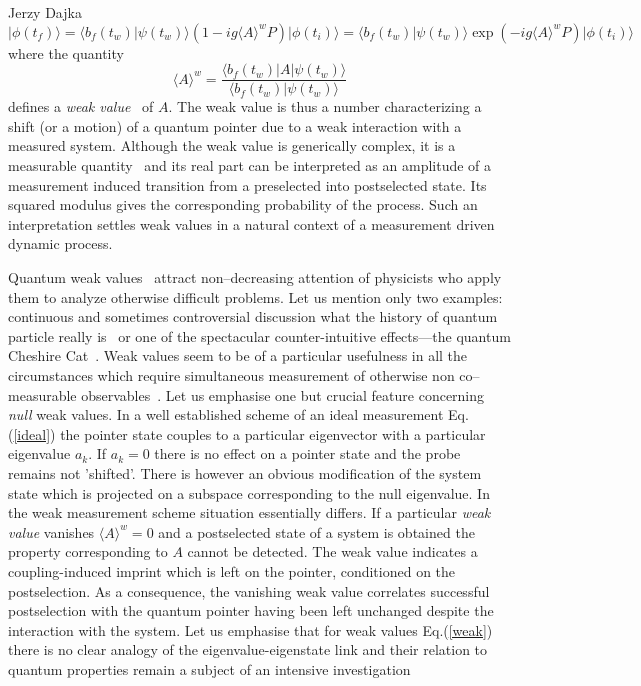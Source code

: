 \begin{artengenv}{Jerzy Dajka}
\begin{equation}
    |\phi(t_f)\rangle=\langle b_f(t_w)|\psi(t_w)\rangle \left( 1-ig\langle A\rangle^w P\right)|\phi(t_i)\rangle=\langle b_f(t_w)|\psi(t_w)\rangle\exp(-ig\langle A\rangle^wP)|\phi(t_i)\rangle
\end{equation}
where the quantity
\begin{equation}\label{weak}
    \langle A\rangle^w=\frac{\langle b_f(t_w)|A|\psi(t_w)\rangle}{\langle b_f(t_w)|\psi(t_w)\rangle}
\end{equation}
 defines a {\it weak value}~\parencite{primus} of $A$. The weak value is thus a number characterizing
a shift (or a motion) of a quantum pointer due to a weak interaction with a measured system. Although the weak value is generically  complex, it is a measurable quantity~\parencite{weak_rmp} and its real part can be interpreted as an amplitude of a measurement induced transition from a preselected into postselected state. Its squared modulus gives the corresponding probability of the process. Such an interpretation settles  weak values in a natural context of a measurement driven dynamic process. 

Quantum weak values~\parencite{primus} attract non--decreasing attention of physicists who  apply them to analyze otherwise difficult problems. Let us mention only two examples: continuous and sometimes controversial discussion what the history of quantum particle really is~\parencite{PhysRevA.87.052104,PhysRevA.89.024102,PhysRevA.96.022126} or one of the  spectacular counter-intuitive effects---the quantum Cheshire Cat~\parencite{cat}. Weak values seem to be of a particular usefulness in all the circumstances which  require simultaneous measurement of otherwise non co--measurable observables~\parencite{cat,weak,e20110854,Aharonov2008,weak_rmp}.  
%
Let us emphasise one but crucial feature concerning {\it null} weak values. In a well established scheme of an ideal measurement Eq.(\ref{ideal}) the pointer state couples to a particular eigenvector with a particular eigenvalue $a_k$. If $a_k=0$ there is no effect on a pointer state and the probe remains not 'shifted'. There is however an obvious modification of the system state which is projected on a subspace corresponding to the null eigenvalue. In the weak measurement scheme situation essentially differs. If a particular {\it weak value} vanishes $\langle A\rangle^w=0$  and a postselected state of a system is obtained  the property corresponding to $A$ cannot be detected. The weak value indicates a
coupling-induced imprint which is left on the pointer, conditioned on the postselection. As a  consequence, the vanishing weak value
correlates successful postselection with the quantum pointer having been left unchanged despite the interaction with the system. Let us emphasise that for  weak values Eq.(\ref{weak})  there is no clear analogy of the eigenvalue-eigenstate link and their relation to quantum properties remain a subject of an intensive investigation~\parencite{Matzkin_prop,weak,e20110854} 


\end{artengenv}

